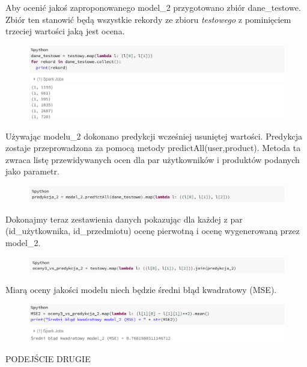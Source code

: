 \documentclass[12pt,a4paper]{report}
\begin{document}
Aby ocenić jakoś zaproponowanego model\_2 przygotowano zbiór dane\_testowe. Zbiór ten stanowić będą wszystkie rekordy ze zbioru \textit{testowego} z pominięciem trzeciej wartości jaką jest ocena.

\begin{figure}[H]
\includegraphics[scale=0.5]{obrazy/ALS9.PNG} 
\end{figure}

Używając modelu\_2 dokonano predykcji wcześniej usuniętej wartości.
Predykcja zostaje przeprowadzona za pomocą metody  predictAll(user,product). Metoda ta zwraca listę przewidywanych ocen dla par użytkowników i produktów podanych jako parametr.

\begin{figure}[H]
\includegraphics[scale=0.5]{obrazy/ALS10.PNG} 
\end{figure}

Dokonajmy teraz zestawienia danych pokazując dla każdej z par (id\_użytkownika, id\_przedmiotu) ocenę pierwotną i ocenę wygenerowaną przez model\_2.

\begin{figure}[H]
\includegraphics[scale=0.5]{obrazy/ALS11.PNG} 
\end{figure}

Miarą oceny jakości modelu niech będzie średni błąd kwadratowy (MSE).

\begin{figure}[H]
\includegraphics[scale=0.5]{obrazy/ALS12.PNG} 
\end{figure}

PODEJŚCIE DRUGIE
\end{document}
